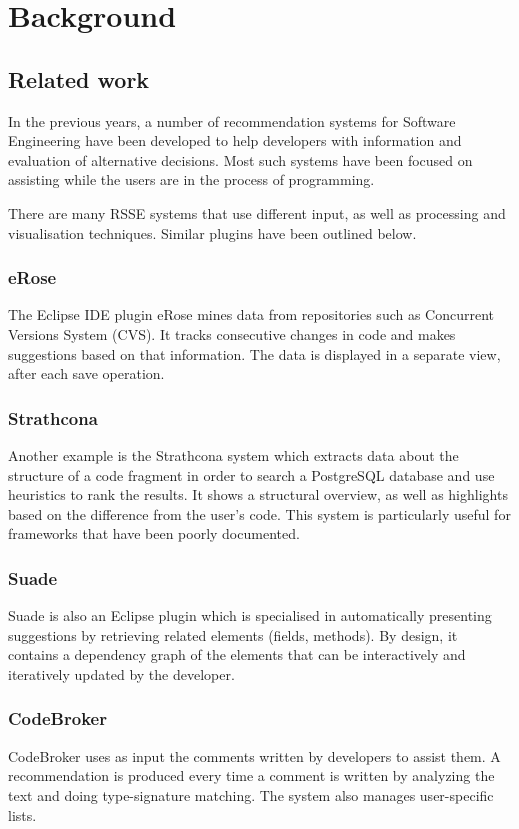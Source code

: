 \documentclass{l4proj}
\begin{document}
\chapter{Background}

\section{Related work}

In the previous years, a number of recommendation systems for Software Engineering have been developed to help developers with information and evaluation of alternative decisions. Most such systems have been focused on assisting while the users are in the process of programming.

There are many RSSE systems that use different input, as well as processing and visualisation techniques. Similar plugins have been outlined below.

\subsection{eRose}
The Eclipse IDE plugin eRose mines data from repositories such as Concurrent Versions System (CVS). It tracks consecutive changes in code and makes suggestions based on that information. The data is displayed in a separate view, after each save operation.

\subsection{Strathcona}
Another example is the Strathcona system which extracts data about the structure of a code fragment in order to search a PostgreSQL database and use heuristics to rank the results. It shows a structural overview, as well as highlights based on the difference from the user's code. This system is particularly useful for frameworks that have been poorly documented.

\subsection{Suade}
Suade is also an Eclipse plugin which is specialised in automatically presenting suggestions by retrieving related elements (fields, methods). By design, it contains a dependency graph of the elements that can be interactively and iteratively updated by the developer.

\subsection{CodeBroker}
CodeBroker uses as input the comments written by developers to assist them. A recommendation is produced every time a comment is written by analyzing the text and doing type-signature matching. The system also manages user-specific lists.
\end{document}
